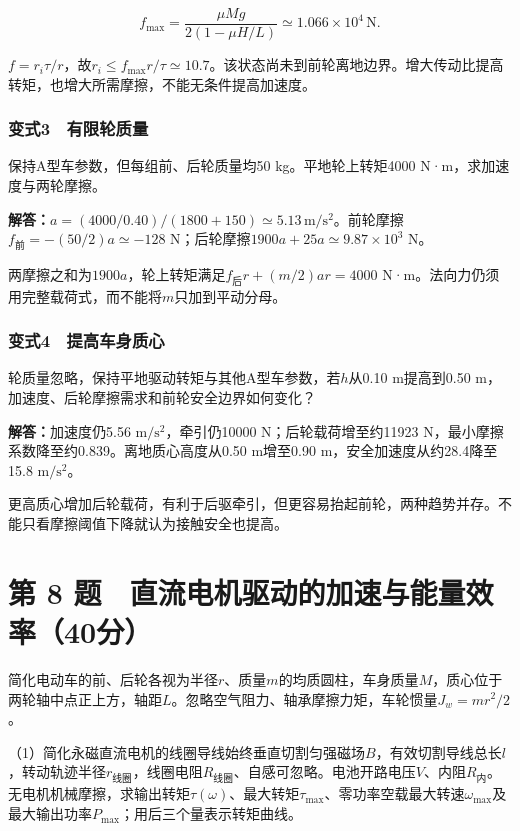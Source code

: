 \documentclass[12pt,a4paper,fontset=fandol]{ctexart}
\begin{document}
\[
f_{\max}=\frac{\mu Mg}{2(1-\mu H/L)}
\simeq1.066\times10^4\,\mathrm N.
\]

\(f=r_i\tau/r\)，故\(r_i\leq f_{\max}r/\tau\simeq10.7\)。该状态尚未到前轮离地边界。增大传动比提高转矩，也增大所需摩擦，不能无条件提高加速度。

\subsubsection{变式3　有限轮质量}\label{ux53d8ux5f0f3-ux6709ux9650ux8f6eux8d28ux91cf}

保持A型车参数，但每组前、后轮质量均50 kg。平地轮上转矩4000
N·m，求加速度与两轮摩擦。

\textbf{解答：}\(a=(4000/0.40)/(1800+150)\simeq5.13\,\mathrm{m/s^2}\)。前轮摩擦\(f_{\text{前}}=-(50/2)a\simeq-128\)
N；后轮摩擦\(1900a+25a\simeq9.87\times10^3\) N。

两摩擦之和为\(1900a\)，轮上转矩满足\(f_{\text{后}}r+(m/2)ar=4000\)
N·m。法向力仍须用完整载荷式，而不能将\(m\)只加到平动分母。

\subsubsection{变式4　提高车身质心}\label{ux53d8ux5f0f4-ux63d0ux9ad8ux8f66ux8eabux8d28ux5fc3}

轮质量忽略，保持平地驱动转矩与其他A型车参数，若\(h\)从0.10 m提高到0.50
m，加速度、后轮摩擦需求和前轮安全边界如何变化？

\textbf{解答：}加速度仍5.56 \(\mathrm{m/s^2}\)，牵引仍10000
N；后轮载荷增至约11923 N，最小摩擦系数降至约0.839。离地质心高度从0.50
m增至0.90 m，安全加速度从约28.4降至15.8 \(\mathrm{m/s^2}\)。

更高质心增加后轮载荷，有利于后驱牵引，但更容易抬起前轮，两种趋势并存。不能只看摩擦阈值下降就认为接触安全也提高。

\clearpage

\section{第 8
题　直流电机驱动的加速与能量效率（40分）}\label{ux7b2c-8-ux9898-ux76f4ux6d41ux7535ux673aux9a71ux52a8ux7684ux52a0ux901fux4e0eux80fdux91cfux6548ux738740ux5206}

简化电动车的前、后轮各视为半径\(r\)、质量\(m\)的均质圆柱，车身质量\(M\)，质心位于两轮轴中点正上方，轴距\(L\)。忽略空气阻力、轴承摩擦力矩，车轮惯量\(J_w=mr^2/2\)。

（1）简化永磁直流电机的线圈导线始终垂直切割匀强磁场\(B\)，有效切割导线总长\(l\)，转动轨迹半径\(r_{\text{线圈}}\)，线圈电阻\(R_{\text{线圈}}\)、自感可忽略。电池开路电压\(V\)、内阻\(R_{\text{内}}\)。无电机机械摩擦，求输出转矩\(\tau(\omega)\)、最大转矩\(\tau_{\max}\)、零功率空载最大转速\(\omega_{\max}\)及最大输出功率\(P_{\max}\)；用后三个量表示转矩曲线。
\end{document}
